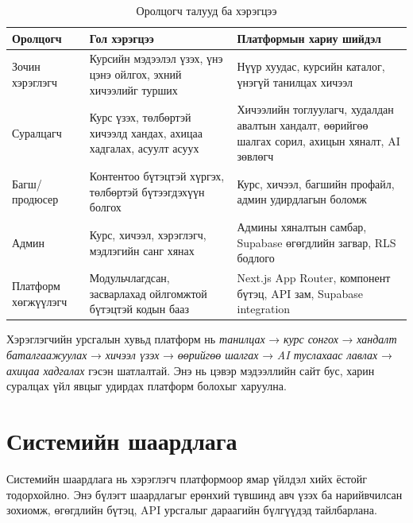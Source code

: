 \begin{table}[htbp]
  \centering
  \begin{tabular}{|p{}|p{}|p{}|}
    \hline
    \textbf{Оролцогч} & \textbf{Гол хэрэгцээ} & \textbf{Платформын хариу шийдэл} \\ \hline
    Зочин хэрэглэгч & Курсийн мэдээлэл үзэх, үнэ цэнэ ойлгох, эхний хичээлийг турших & Нүүр хуудас, курсийн каталог, үнэгүй танилцах хичээл \\ \hline
    Суралцагч & Курс үзэх, төлбөртэй хичээлд хандах, ахицаа хадгалах, асуулт асуух & Хичээлийн тоглуулагч, худалдан авалтын хандалт, өөрийгөө шалгах сорил, ахицын хяналт, AI зөвлөгч \\ \hline
    Багш/продюсер & Контентоо бүтэцтэй хүргэх, төлбөртэй бүтээгдэхүүн болгох & Курс, хичээл, багшийн профайл, админ удирдлагын боломж \\ \hline
    Админ & Курс, хичээл, хэрэглэгч, мэдлэгийн санг хянах & Админы хяналтын самбар, Supabase өгөгдлийн загвар, RLS бодлого \\ \hline
    Платформ хөгжүүлэгч & Модульчлагдсан, засварлахад ойлгомжтой бүтэцтэй кодын бааз & Next.js App Router, компонент бүтэц, API зам, Supabase integration \\ \hline
  \end{tabular}
  \caption{Оролцогч талууд ба хэрэгцээ}
  \label{tab:stakeholders}
\end{table}

Хэрэглэгчийн урсгалын хувьд платформ нь \textit{танилцах} → \textit{курс сонгох} → \textit{хандалт баталгаажуулах} → \textit{хичээл үзэх} → \textit{өөрийгөө шалгах} → \textit{AI туслахаас лавлах} → \textit{ахицаа хадгалах} гэсэн шатлалтай. Энэ нь цэвэр мэдээллийн сайт бус, харин суралцах үйл явцыг удирдах платформ болохыг харуулна.

\section{Системийн шаардлага}
Системийн шаардлага нь хэрэглэгч платформоор ямар үйлдэл хийх ёстойг тодорхойлно. Энэ бүлэгт шаардлагыг ерөнхий түвшинд авч үзэх ба нарийвчилсан зохиомж, өгөгдлийн бүтэц, API урсгалыг дараагийн бүлгүүдэд тайлбарлана.

